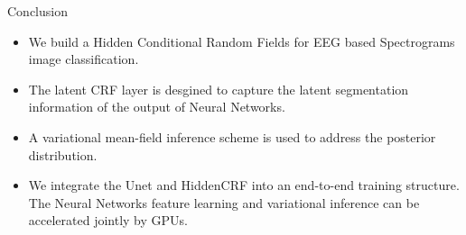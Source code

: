 \documentclass[leqno]{beamer}
\begin{document}
\begin{frame}{Conclusion}
\begin{itemize}
\item We build a Hidden Conditional Random Fields for EEG based Spectrograms
image classification.
\bigskip
\item The latent CRF layer is desgined to capture the latent segmentation
information of the output of Neural Networks.
\bigskip
\item A variational mean-field inference scheme is used to address the
posterior distribution.
\bigskip
\item We integrate the Unet and HiddenCRF into an end-to-end training structure.
The Neural Networks feature learning and variational inference can be
accelerated jointly by GPUs.
\end{itemize}
\end{frame}

















%
%
\end{document}
